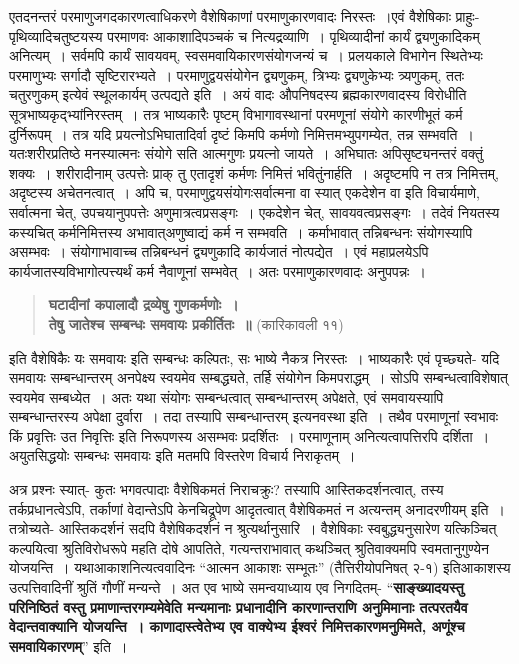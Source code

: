 {एतदनन्तरं परमाणुजगदकारणत्वाधिकरणे वैशेषिकाणां परमाणुकारणवादः निरस्तः~।\break एवं वैशेषिकाः प्राहुः- पृथिव्यादिचतुष्टयस्य परमाणवः आकाशादिपञ्चकं च नित्यद्रव्याणि~। पृथिव्यादीनां कार्यं द्व्यणुकादिकम् अनित्यम्~। सर्वमपि कार्यं सावयवम्, स्वसमवायिकारणसंयोगजन्यं च~। प्रलयकाले विभागेन स्थितेभ्यः परमाणुभ्यः सर्गादौ सृष्टिरारभ्यते~। परमाणु\-द्वयसंयोगेन द्व्यणुकम्, त्रिभ्यः द्व्यणुकेभ्यः त्र्यणुकम्, ततः चतुरणुकम् इत्येवं स्थूलकार्यम् उत्पद्यते इति~। अयं वादः औपनिषदस्य ब्रह्मकारणवादस्य विरोधीति सूत्रभाष्यकृद्भ्यां\break निरस्तम्~। तत्र भाष्यकारैः पृष्टम् विभागावस्थानां परमणूनां संयोगे कारणीभूतं कर्म दुर्निरूपम्~। तत्र यदि प्रयत्नोऽभिघातादिर्वा दृष्टं किमपि कर्मणो निमित्तमभ्युपगम्येत, तन्न सम्भवति~। यतः\break शरीरप्रतिष्ठे मनस्यात्मनः संयोगे सति आत्मगुणः प्रयत्नो जायते~। अभिघातः अपि\break सृष्ट्यनन्तरं वक्तुं शक्यः~। शरीरादीनाम् उत्पत्तेः प्राक् तु एतादृशं कर्मणः निमित्तं भवितुं\break नार्हति~। अदृष्टमपि न तत्र निमित्तम्, अदृष्टस्य अचेतनत्वात्~। अपि च, परमाणुद्वयसंयोगः\break सर्वात्मना वा स्यात् एकदेशेन वा इति विचार्यमाणे, सर्वात्मना चेत्, उपचयानुपपत्तेः अणु\-मात्रत्वप्रसङ्गः~। एकदेशेन चेत्, सावयवत्वप्रसङ्गः~। तदेवं नियतस्य कस्यचित् कर्मनिमित्तस्य अभावात्\break अणुष्वाद्यं कर्म न सम्भवति~। कर्माभावात् तन्निबन्धनः संयोगस्यापि असम्भवः~। संयोगा\-भावाच्च तन्निबन्धनं द्व्यणुकादि कार्यजातं नोत्पद्येत~। एवं महाप्रलयेऽपि कार्यजातस्य\break विभागोत्पत्त्यर्थं कर्म नैवाणूनां सम्भवेत्~। अतः परमाणुकारणवादः अनुपपन्नः~। 
\begin{verse}
\textbf{घटादीनां कपालादौ द्रव्येषु गुणकर्मणोः~। \\
तेषु जातेश्च सम्बन्धः समवायः प्रकीर्तितः~॥} (कारिकावली ११)
\end{verse}
इति वैशेषिकैः यः समवायः इति सम्बन्धः कल्पितः, सः भाष्ये नैकत्र निरस्तः~। भाष्यकारैः एवं पृच्छ्यते- यदि समवायः सम्बन्धान्तरम् अनपेक्ष्य स्वयमेव सम्बद्ध्यते, तर्हि संयोगेन किमपराद्धम्~। सोऽपि सम्बन्धत्वाविशेषात् स्वयमेव सम्बध्येत~। अतः यथा संयोगः सम्बन्धत्वात् सम्बन्धान्तरम् अपेक्षते, एवं समवायस्यापि सम्बन्धान्तरस्य अपेक्षा दुर्वारा~। तदा तस्यापि सम्बन्धान्तरम् इत्यनवस्था इति~। तथैव परमाणूनां स्वभावः किं प्रवृत्तिः उत निवृत्तिः इति निरूपणस्य असम्भवः प्रदर्शितः~। परमाणूनाम् अनित्यत्वापत्तिरपि दर्शिता~। अयुतसिद्धयोः सम्बन्धः समवायः इति मतमपि विस्तरेण विचार्य निराकृतम्~। 

अत्र प्रश्नः स्यात्- कुतः भगवत्पादाः वैशेषिकमतं निराचक्रुः? तस्यापि आस्तिक\-दर्शनत्वात्, तस्य तर्कप्रधानत्वेऽपि, तर्काणां वेदान्तेऽपि केनचिद्रूपेण आदृतत्वात् वैशेषिक\-मतं न अत्यन्तम् अनादरणीयम् इति~। तत्रोच्यते- आस्तिकदर्शनं सदपि वैशेषिकदर्शनं न श्रुत्यर्थानुसारि~। वैशेषिकाः स्वबुद्ध्यनुसारेण यत्किञ्चित् कल्पयित्वा श्रुतिविरोधरूपे महति दोषे आपतिते, गत्यन्तराभावात् कथञ्चित् श्रुतिवाक्यमपि स्वमतानुगुण्येन योजयन्ति~। यथा\break आकाशनित्यत्ववादिनः “आत्मन आकाशः सम्भूतः” (तैत्तिरीयोपनिषत् २-१) इति\break आकाशस्य उत्पत्तिवादिनीं श्रुतिं गौणीं मन्यन्ते~। अत एव भाष्ये समन्वयाध्याय एव निगदितम्- “\textbf{साङ्ख्यादयस्तु परिनिष्ठितं वस्तु प्रमाणान्तरगम्यमेवेति मन्यमानाः प्रधानादीनि कारणान्तराणि अनुमिमानाः तत्परतयैव वेदान्तवाक्यानि योजयन्ति~। काणादास्त्वेतेभ्य एव वाक्येभ्य ईश्वरं निमित्तकारणमनुमिमते, अणूंश्च समवायिकारणम्}” इति~। 

}
